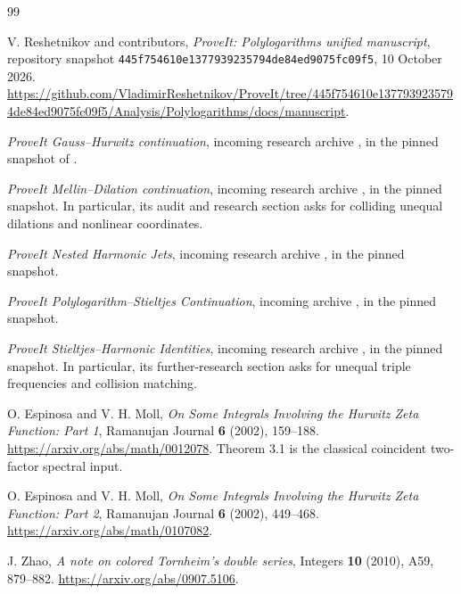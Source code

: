 \begin{thebibliography}{99}
\small
\raggedright
\setlength{\itemsep}{3pt}
\setlength{\parskip}{0pt}

V. Reshetnikov and contributors,
\emph{ProveIt: Polylogarithms unified manuscript},
repository snapshot \texttt{445f754610e1377939235794de84ed9075fc09f5},
10 October 2026.
\url{https://github.com/VladimirReshetnikov/ProveIt/tree/445f754610e1377939235794de84ed9075fc09f5/Analysis/Polylogarithms/docs/manuscript}.

\emph{ProveIt Gauss--Hurwitz continuation}, incoming research archive
, in the pinned
 snapshot of \cite{ProveIt}.

\emph{ProveIt Mellin--Dilation continuation}, incoming research archive
, in the pinned snapshot.
In particular, its audit and research section asks for colliding
unequal dilations and nonlinear coordinates.

\emph{ProveIt Nested Harmonic Jets}, incoming research archive
, in the pinned snapshot.

\emph{ProveIt Polylogarithm--Stieltjes Continuation}, incoming archive
,
in the pinned snapshot.

\emph{ProveIt Stieltjes--Harmonic Identities}, incoming research archive
,
in the pinned snapshot. In particular, its further-research section
asks for unequal triple frequencies and collision matching.

O. Espinosa and V. H. Moll,
\emph{On Some Integrals Involving the Hurwitz Zeta Function: Part 1},
Ramanujan Journal \textbf{6} (2002), 159--188.
\url{https://arxiv.org/abs/math/0012078}.
Theorem 3.1 is the classical coincident two-factor spectral input.

O. Espinosa and V. H. Moll,
\emph{On Some Integrals Involving the Hurwitz Zeta Function: Part 2},
Ramanujan Journal \textbf{6} (2002), 449--468.
\url{https://arxiv.org/abs/math/0107082}.

J. Zhao, \emph{A note on colored Tornheim's double series},
Integers \textbf{10} (2010), A59, 879--882.
\url{https://arxiv.org/abs/0907.5106}.


\end{thebibliography}
